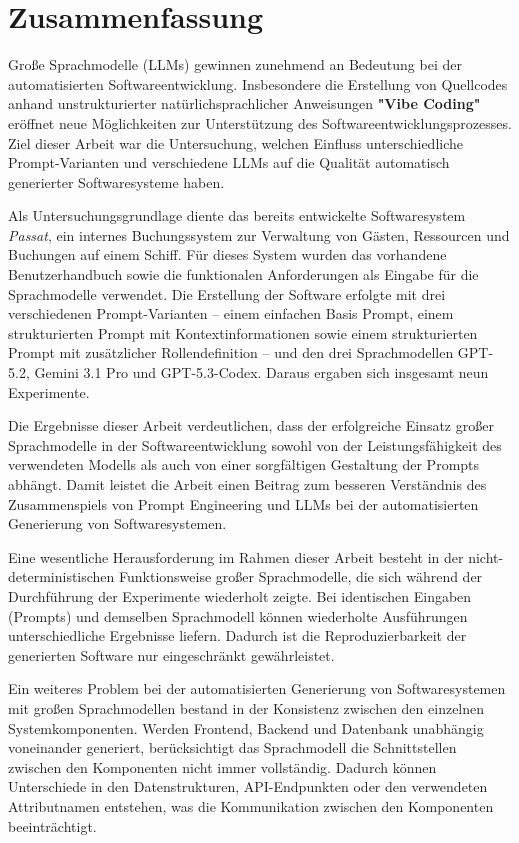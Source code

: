 \chapter{Zusammenfassung}
\label{fazit und ausblick}

Große Sprachmodelle (LLMs) gewinnen zunehmend an Bedeutung bei der automatisierten Softwareentwicklung. Insbesondere die Erstellung von Quellcodes anhand unstrukturierter natürlichsprachlicher Anweisungen \textbf{"Vibe Coding"} eröffnet neue Möglichkeiten zur Unterstützung des Softwareentwicklungsprozesses. Ziel dieser Arbeit war die Untersuchung, welchen Einfluss unterschiedliche Prompt-Varianten und verschiedene LLMs auf die Qualität automatisch generierter Softwaresysteme haben.

Als Untersuchungsgrundlage diente das bereits entwickelte Softwaresystem \textit{Passat}, ein internes Buchungssystem zur Verwaltung von Gästen, Ressourcen und Buchungen auf einem Schiff. Für dieses System wurden das vorhandene Benutzerhandbuch sowie die funktionalen Anforderungen als Eingabe für die Sprachmodelle verwendet. Die Erstellung der Software erfolgte mit drei verschiedenen Prompt-Varianten – einem einfachen Basis Prompt, einem strukturierten Prompt mit Kontextinformationen sowie einem strukturierten Prompt mit zusätzlicher Rollendefinition – und den drei Sprachmodellen GPT-5.2, Gemini 3.1 Pro und GPT-5.3-Codex. Daraus ergaben sich insgesamt neun Experimente.


Die Ergebnisse dieser Arbeit verdeutlichen, dass der erfolgreiche Einsatz großer Sprachmodelle in der Softwareentwicklung sowohl von der Leistungsfähigkeit des verwendeten Modells als auch von einer sorgfältigen Gestaltung der Prompts abhängt. Damit leistet die Arbeit einen Beitrag zum besseren Verständnis des Zusammenspiels von Prompt Engineering und LLMs bei der automatisierten Generierung von Softwaresystemen.

Eine wesentliche Herausforderung im Rahmen dieser Arbeit besteht in der nicht-deterministischen Funktionsweise großer Sprachmodelle, die sich während der Durchführung der Experimente wiederholt zeigte. Bei identischen Eingaben (Prompts) und demselben Sprachmodell können wiederholte Ausführungen unterschiedliche Ergebnisse liefern. Dadurch ist die Reproduzierbarkeit der generierten Software nur eingeschränkt gewährleistet.


Ein weiteres Problem bei der automatisierten Generierung von Softwaresystemen mit großen Sprachmodellen bestand in der Konsistenz zwischen den einzelnen Systemkomponenten. Werden Frontend, Backend und Datenbank unabhängig voneinander generiert, berücksichtigt das Sprachmodell die Schnittstellen zwischen den Komponenten nicht immer vollständig. Dadurch können Unterschiede in den Datenstrukturen, API-Endpunkten oder den verwendeten Attributnamen entstehen, was die Kommunikation zwischen den Komponenten beeinträchtigt.

